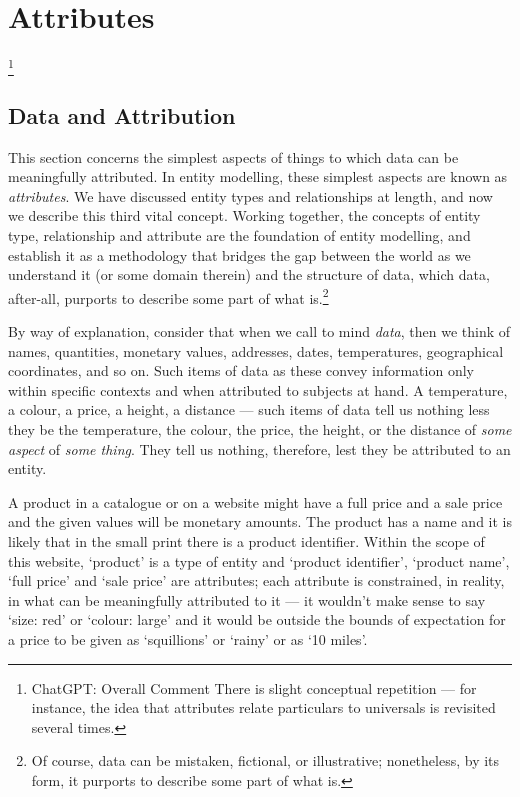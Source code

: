 

\section{Attributes}
\label{Attributes} 
\footnote{ChatGPT: Overall Comment
There is slight conceptual repetition — for instance, the idea that attributes relate particulars to universals is revisited several times.} 
\subsection{Data and Attribution}
\mynote
This section concerns the simplest aspects of things 
to which data can be meaningfully attributed. 
In entity modelling, these simplest aspects are known as \textit{attributes}.
We have discussed entity types and relationships at length, and now  we describe this  third vital concept.
Working together, the concepts of entity type, relationship and attribute
are the foundation of entity modelling, and establish it as a methodology that  bridges the gap between the world as we understand it (or some domain therein) and the structure of data, which data, after-all, purports to describe some part of what is.\footnote{Of course, data can be mistaken, fictional, or illustrative; nonetheless, by its form, it purports to describe some part of what is. } 

\mynote
By way of explanation, 
consider that when we call to mind \textit{data}, 
then we think of names, quantities, monetary values, 
addresses, dates, temperatures, geographical coordinates, and so on. 
Such items of data as these convey information only within specific contexts and when attributed 
to subjects at hand. 
A temperature, a colour, a price, a height, a distance — such items of data 
tell us nothing less they be the temperature, the colour, the price, the height, or the 
distance of \textit{some aspect} of \textit{some thing}. 
They tell us nothing, therefore, lest they be attributed to an entity.

\mynote
A product in a catalogue or on a website  might have a full price and a sale price
and the given values will be monetary amounts.
The product has a name 
and it is likely that in the small print there is a product identifier.
Within the scope of this website, `product' is a type of entity
and `product identifier', `product name',  `full price' and `sale price' are attributes;
each attribute is constrained, in reality, in what can be meaningfully attributed to it ---
it wouldn't make sense to say `size: red' or `colour: large' and
it  would be outside the bounds of expectation 
for a price to be given as `squillions' or `rainy' or as `10 miles'.

